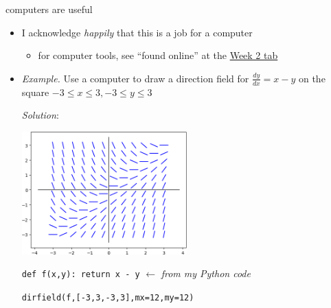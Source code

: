 \documentclass{beamer}
\begin{document}
\begin{frame}{computers are useful}

\begin{itemize}
\item I acknowledge \emph{happily} that this is a job for a computer
    \begin{itemize}
    \item for computer tools,  see ``found online'' at the \href{https://bueler.github.io/math302/week2.html}{\color{blue} Week 2 tab}
    \end{itemize}

\medskip
\item \emph{Example.}  Use a computer to draw a direction field for
$\frac{dy}{dx} = x-y$ on the square $-3 \le x \le 3, -3 \le y \le 3$

\bigskip
\emph{Solution}:

\vspace{-3mm}
\hfill \includegraphics[width=0.5\textwidth]{figs/example-field} \phantom{as dfjadl dsf}

\medskip
\scriptsize
\texttt{def f(x,y):  return x - y}  \hfill $\longleftarrow$ \emph{from my Python code}

\texttt{dirfield(f,[-3,3,-3,3],mx=12,my=12)}
\end{itemize}
\end{frame}
\end{document}
